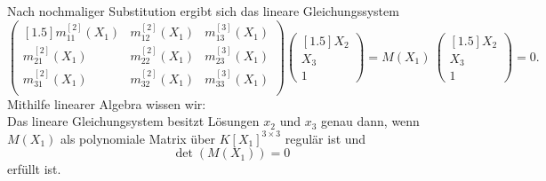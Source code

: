 \documentclass[11pt]{beamer}
\theoremstyle{custom}
\theoremstyle{custom}
\begin{document}
	\begin{frame}
		Nach nochmaliger Substitution ergibt sich das lineare Gleichungssystem
		\begin{equation}\label{eqn:E3Q3_M_eq}
			\begin{pmatrix}[1.5]
				m_{11}^{\left[ 2\right]}\left( X_{1}\right) & m_{12}^{\left[ 2\right]}\left( X_{1}\right) & m_{13}^{\left[ 3\right]}\left( X_{1}\right) \\
				m_{21}^{\left[ 2\right]}\left( X_{1}\right) & m_{22}^{\left[ 2\right]}\left( X_{1}\right) & m_{23}^{\left[ 3\right]}\left( X_{1}\right) \\
				m_{31}^{\left[ 2\right]}\left( X_{1}\right) & m_{32}^{\left[ 2\right]}\left( X_{1}\right) & m_{33}^{\left[ 3\right]}\left( X_{1}\right) \\
			\end{pmatrix}
			\begin{pmatrix}[1.5]
				X_{2}\\
				X_{3}\\
				1
			\end{pmatrix}
			= M\left( X_{1}\right) \ \begin{pmatrix}[1.5]
				X_{2}\\
				X_{3}\\
				1
			\end{pmatrix}
			=0.
		\end{equation}
		\pause
		Mithilfe linearer Algebra wissen wir:\\
		Das lineare Gleichungsystem besitzt Lösungen $x_2$ und $x_3$ genau dann, wenn $M\left( X_{1}\right)$ als polynomiale Matrix über $K[X_{1}]^{3 \times 3}$ regulär ist und \begin{equation}\label{eqn:det_zero}
			\det\left(M\left( X_{1}\right)  \right) = 0
		\end{equation}
		erfüllt ist.
	\end{frame}
\end{document}
